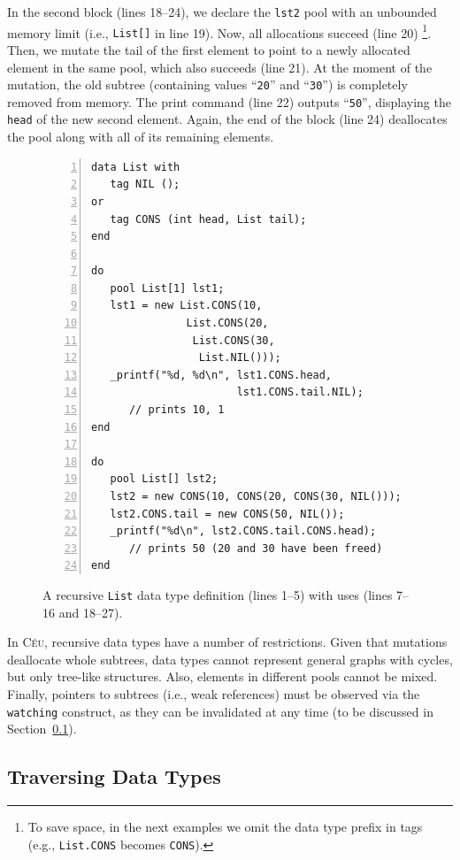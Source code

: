 \documentclass{sig-alternate}
\newcommand{\CEU}{\textsc{C\'{e}u}\xspace}
\newcommand{\code}[1] {{\small{\texttt{#1}}}}
\begin{document}
In the second block (lines 18--24), we declare the \code{lst2} pool with an 
unbounded memory limit (i.e., \code{List[]} in line 19).
Now, all allocations succeed (line 20)%
\footnote{To save space, in the next examples we omit the data type prefix in 
tags (e.g., \code{List.CONS} becomes \code{CONS}).}.
Then, we mutate the tail of the first element to point to a newly allocated 
element in the same pool, which also succeeds (line 21).
At the moment of the mutation, the old subtree (containing values  
``\texttt{20}'' and  ``\texttt{30}'') is completely removed from memory.
The print command (line 22) outputs ``\texttt{50}'', displaying the \code{head}
of the new second element.
%
Again, the end of the block (line 24) deallocates the pool along with all of 
its remaining elements.


\begin{figure}[t]
\begin{lstlisting}[numbers=left,xleftmargin=3em]
data List with
   tag NIL ();
or
   tag CONS (int head, List tail);
end

do
   pool List[1] lst1;
   lst1 = new List.CONS(10,
               List.CONS(20,
                List.CONS(30,
                 List.NIL()));
   _printf("%d, %d\n", lst1.CONS.head,
                       lst1.CONS.tail.NIL);
      // prints 10, 1
end

do
   pool List[] lst2;
   lst2 = new CONS(10, CONS(20, CONS(30, NIL()));
   lst2.CONS.tail = new CONS(50, NIL());
   _printf("%d\n", lst2.CONS.tail.CONS.head);
      // prints 50 (20 and 30 have been freed)
end
\end{lstlisting}
\caption{
A recursive \code{List} data type definition (lines 1--5) with uses (lines 
7--16 and 18--27).
\label{lst.list}
}
\end{figure}

In \CEU, recursive data types have a number of restrictions.
Given that mutations deallocate whole subtrees, data types cannot represent 
general graphs with cycles, but only tree-like structures.
Also, elements in different pools cannot be mixed.
Finally, pointers to subtrees (i.e., weak references) must be observed via the
\code{watching} construct, as they can be invalidated at any time
(to be discussed in Section~\ref{sec.traverse}).


\subsection{Traversing Data Types}
\label{sec.traverse}
\end{document}
